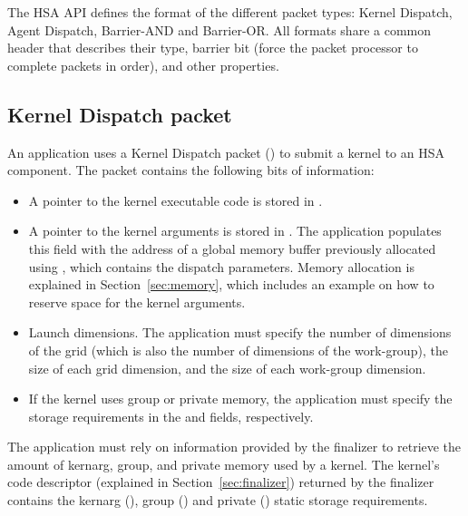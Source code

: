 \documentclass[final,oneside]{book}
\begin{document}
The HSA API defines the format of the different packet types: Kernel Dispatch,
Agent Dispatch, Barrier-AND and Barrier-OR. All formats share a common header
 that describes their type, barrier bit (force the
packet processor to complete packets in order), and other properties.

\subsection{Kernel Dispatch packet}\label{dispatch-packet}

An application uses a Kernel Dispatch packet
() to submit a kernel to an HSA
component. The packet contains the following bits of information:
\begin{itemize}[itemsep=1pt,topsep=3pt,partopsep=0pt]
\item A pointer to the kernel executable code is stored in
  .
\item A pointer to the kernel arguments is stored in
  . The application
  populates this field with the address of a global memory buffer previously
  allocated using , which contains the dispatch
  parameters. Memory allocation is explained in Section~\ref{sec:memory}, which
  includes an example on how to reserve space for the kernel arguments.
\item Launch dimensions. The application must specify the number of dimensions
  of the grid (which is also the number of dimensions of the work-group), the
  size of each grid dimension, and the size of each work-group dimension.
\item If the kernel uses group or private memory, the application must specify
  the storage requirements in the
   and
   fields,
  respectively.
\end{itemize}

The application must rely on information provided by the finalizer to retrieve
the amount of kernarg, group, and private memory used by a kernel. The kernel's
code descriptor (explained in Section~\ref{sec:finalizer}) returned by the
finalizer contains the kernarg
(), group
() and
private ()
static storage requirements.
\end{document}
